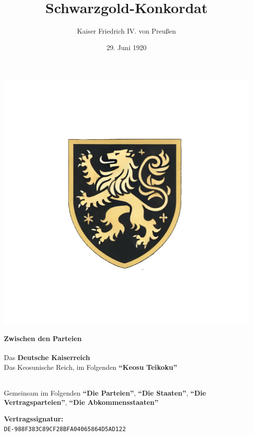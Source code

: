 \documentclass{article}
\title{Schwarzgold-Konkordat}
\author{Kaiser Friedrich IV. von Preußen}
\date{29. Juni 1920}
\begin{document}
\maketitle
\begin{center}
    \includegraphics[scale=.22]{coa_blackgold_concordat.png}
\end{center}
\begin{center}
    \textbf{Zwischen den Parteien\\}\textbf{\\}
    Das \textbf{Deutsche Kaiserreich\\}
    Das Keosunische Reich, im Folgenden \textbf{``Keosu Teikoku''}\\
    \textbf{\\}

    Gemeinsam im Folgenden \textbf{``Die Parteien''}, \textbf{``Die Staaten''}, \textbf{``Die Vertragsparteien''}, \textbf{``Die Abkommensstaaten''}
\end{center}
\newpage
{}
\vspace*{\fill}
\begin{Center}
\textbf{Vertragssignatur:\\}
\texttt{DE-988F383C89CF28BFA04065864D5AD122}
\vspace*{\fill}
\end{Center}
\newpage
\tableofcontents
\newpage
\end{document}
